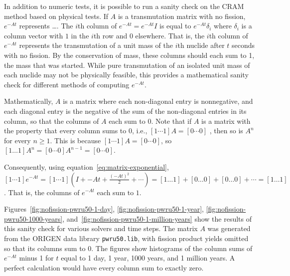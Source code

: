 In addition to numeric tests, it is possible to run a sanity check on the CRAM
method based on physical tests. If $A$ is a transmutation matrix with no
fission, $e^{-At}$ represents {\color{red}\ldots}. The $i$th column of
$e^{-At}=e^{-At}I$ is equal to $e^{-At}\delta_{i}$ where $\delta_i$ is a
column vector with $1$ in the $i$th row and $0$ elsewhere. That is, the $i$th
column of $e^{-At}$ represents the transmutation of a unit mass of the $i$th
nuclide after $t$ seconds with no fission. By the conservation of mass, these
columns should each sum to 1, the mass that was started. While pure
transmutation of an isolated unit mass of each nuclide may not be physically
feasible, this provides a mathematical sanity check for different methods of
computing $e^{-At}$.

Mathematically, $A$ is a matrix where each non-diagonal entry is nonnegative,
and each diagonal entry is the negative of the sum of the non-diagonal entries
in its column, so that the columns of $A$ each sum to $0$. Note that if $A$ is
a matrix with the property that every column sums to $0$, i.e.,
$[1 \cdots 1] A = [0 \cdots 0]$ ,
then so is $A^n$ for every $n\geq 1$. This is because
$[1 \cdots 1] A = [0 \cdots 0]$, so
$[1 \ldots 1] A^n = [0 \cdots 0] A^{n-1} = [0\cdots 0]$.

Consequently, using equation~\ref{eq:matrix-exponential},
$[1 \cdots 1]e^{-At} = [1 \cdots 1] (I + -At + \frac{(-At)^2}{2} + \cdots) = [1\ldots
1] + [0 \ldots 0] + [0 \ldots 0] + \cdots = [1\ldots 1]$. That is,
the columns of $e^{-At}$ each sum to $1$.

Figures~\ref{fig:nofission-pwru50-1-day}, \ref{fig:nofission-pwru50-1-year},
\ref{fig:nofission-pwru50-1000-years},
and~\ref{fig:nofission-pwru50-1-million-years} show the results of this sanity
check for various solvers and time steps. The matrix $A$ was generated from
the ORIGEN data library \texttt{pwru50.lib}, with fission product yields
omitted so that its columns sum to $0$. The figures show histograms of the
column sums of $e^{-At}$ minus 1 for $t$ equal to 1 day, 1 year, 1000 years,
and 1 million years. A perfect calculation would have every column sum to
exactly zero.

